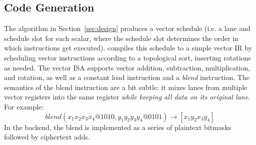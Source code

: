 



\subsection{Code Generation}\label{sec:codegen}
The algorithm in Section~\ref{sec:design} produces a vector schedule (i.e. a lane and schedule slot for each scalar, where the schedule slot determines the order in which instructions get executed).
\system compiles this schedule to a simple vector IR by scheduling vector instructions according to a topological sort, inserting rotations as needed.
The vector ISA supports vector addition, subtraction, multiplication, and rotation, as well as a constant load instruction and a {\em blend} instruction.
The semantics of the blend instruction are a bit subtle: it mixes lanes from multiple vector registers into the same register {\em while keeping all data on its original lane}.
For example: $$blend(x_1x_2x_3x_4@1010, y_1y_2y_3y_4@0101) \to [x_1y_2x_3y_4]$$
In the backend, the blend is implemented as a series of plaintext bitmasks followed by ciphertext adds. 

